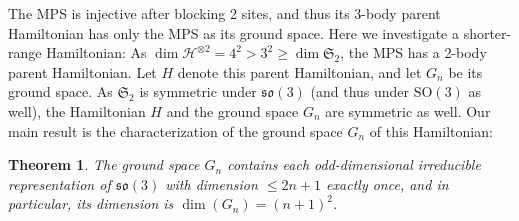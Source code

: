 \documentclass[a4paper]{article}
\newcommand{\SO}{\mathrm{SO}}
\newcommand{\so}{\mathfrak{so}}
\newtheorem{theorem}{Theorem}
\theoremstyle{definition}
\begin{document}
The MPS is injective after blocking 2 sites, and thus its 3-body parent Hamiltonian has only the MPS as its ground space. Here we investigate a shorter-range Hamiltonian: As $\dim \mathcal{H}^{\otimes 2} = 4^2>3^2 \geq \dim\mathfrak{S}_2$, the MPS has a 2-body parent Hamiltonian. Let $H$ denote this parent Hamiltonian, and let $G_n$ be its ground space. As $\mathfrak{S}_2$ is symmetric under $\so(3)$ (and thus under $\SO(3)$ as well), the Hamiltonian $H$ and the ground space $G_n$ are symmetric as well. Our main result is the characterization of the ground space $G_n$ of this Hamiltonian:
\begin{theorem}\label{thm:main}
    The ground space $G_n$ contains each odd-dimensional irreducible representation of $\so(3)$ with dimension $\leq 2n+1$ exactly once, and in particular, its dimension is $\dim(G_n) =(n+1)^2$.
\end{theorem}
\end{document}
